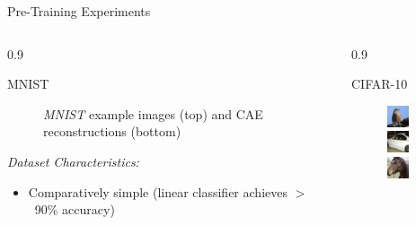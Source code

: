 \documentclass[final]{beamer}
\newlength{\onecolwid}
\newlength{\threecolwid}
\begin{document}
\begin{frame}[t]
\begin{columns}[t]
\begin{column}{\threecolwid}
\begin{alertblock}{Pre-Training Experiments}
\begin{columns}[t, totalwidth=0.9\threecolwid]
\begin{column}{0.9\onecolwid}
\begin{block}{MNIST}
\begin{figure}
	\caption{\emph{MNIST} example images (top) and CAE reconstructions (bottom)}

	\end{figure}

	\emph{Dataset Characteristics:}

	\begin{itemize}
		\item Comparatively simple (linear classifier achieves $>$~90\% accuracy)
	\end{itemize}

	\end{block}
	\end{column}

	\begin{column}{0.9\onecolwid}
	\begin{block}{CIFAR-10}
	\begin{figure}
	\centering
	\includegraphics[width=0.2\linewidth]{../graphics/reconstructions/cifar/input_00.png}
	\includegraphics[width=0.2\linewidth]{../graphics/reconstructions/cifar/input_01.png}
	\includegraphics[width=0.2\linewidth]{../graphics/reconstructions/cifar/input_02.png}


\end{figure}
\end{block}
\end{column}
\end{columns}
\end{alertblock}
\end{column}
\end{columns}
\end{frame}
\end{document}
